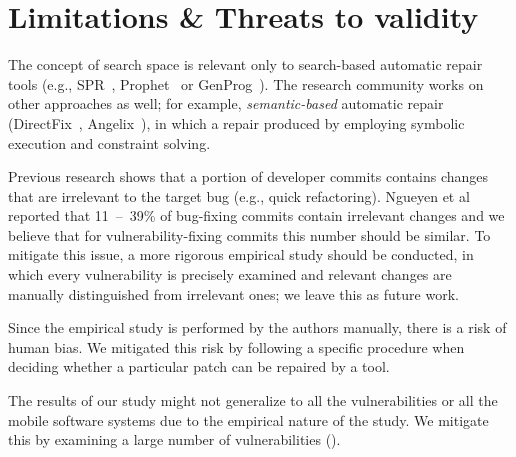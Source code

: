 \section{Limitations \& Threats to validity}

The concept of search space is relevant only to search-based automatic repair tools (e.g., SPR~\cite{long2015staged}, Prophet~\cite{long2015prophet} or GenProg~\cite{le2012systematic}).
The research community works on other approaches as well; for example, \emph{semantic-based} automatic repair (DirectFix~\cite{directfix}, Angelix~\cite{mechtaev2016angelix}), in which a repair produced by employing symbolic execution and constraint solving.

Previous research shows that a portion of developer commits contains changes that are irrelevant to the target bug (e.g., quick refactoring).
Ngueyen et al~\cite{nguyen2013filtering} reported that 11~--~39\% of bug-fixing commits contain irrelevant changes and we believe that for vulnerability-fixing commits this number should be similar.
To mitigate this issue, a more rigorous empirical study should be conducted, in which every vulnerability is precisely examined and relevant changes are manually distinguished from irrelevant ones; we leave this as future work.

Since the empirical study is performed by the authors manually, there is a risk of human bias.
We mitigated this risk by following a specific procedure when deciding whether a particular patch can be repaired by a tool.

The results of our study might not generalize to all the vulnerabilities or all the mobile software systems due to the empirical nature of the study.
We mitigate this by examining a large number of vulnerabilities (\numvuln).
